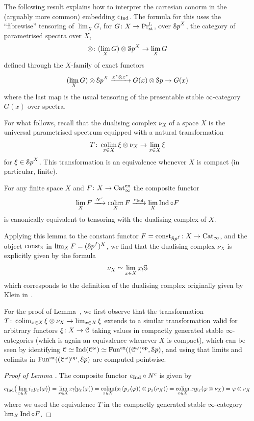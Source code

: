 The following result explains how to interpret the cartesian conorm in the (arguably more common) embedding $e_{\operatorname{Ind}}$. The formula for this uses the ``fibrewise'' tensoring of $\lim_X G$, for $G\colon X\to \mathrm{Pr}^{\mathrm{L}}_{\mathrm{st}}$, over ${\mathcal Sp}^X$, the category of parametrised spectra over $X$, 
\[
\otimes \colon (\lim_X G) \otimes {\mathcal Sp}^X \to \lim_X G
\]
defined through the $X$-family of exact functors
\[
(\lim_X G)\otimes {\mathcal Sp}^X \xrightarrow{x^*\otimes x^*} G(x)\otimes {\mathcal Sp} \to G(x)
\]
where the last map is the usual tensoring of the presentable stable $\infty$-category $G(x)$ over spectra.

For what follows, recall that the dualising complex $\nu_X$ of a space $X$ is the universal parametrised spectrum equipped with a natural transformation 
\[
T\colon \mathop{\mathrm{colim}}_{x\in X} \xi\otimes \nu_X \to \lim_{x\in X} \xi
\]
for $\xi\in {\mathcal Sp}^X$. This transformation is %
an equivalence whenever $X$ is compact (in particular, finite). 

\begin{lemma}
\label{lem:e_Ind_of_cartesian_conorm}%
For any finite space $X$ and $F\colon X\to \mathrm{Cat}_\infty^{\mathrm{ex}}$ the %
composite functor 
\[
\lim_X F \xrightarrow{N^c} \mathop{\mathrm{colim}}_X F \xrightarrow{e_{\operatorname{Ind}}} \lim_X \operatorname{Ind}\circ F
\]
is canonically equivalent to tensoring with the dualising complex of $X$.
\end{lemma}


\begin{remark}
Applying this lemma to the constant functor $F=\mathrm{const}_{{\mathcal Sp}^f}\colon X\to \mathrm{Cat}_\infty$, and the object $\mathrm{const}_{\mathbb{S}}$ in $\lim_X F = ({\mathcal Sp}^f)^X$,  we find that the dualising complex $\nu_X$ is explicitly given by the formula 
\[
\nu_X \simeq \lim_{x\in X} x_! \mathbb{S}
\]
which corresponds to the definition of the dualising complex originally given by Klein in \cite{klein-dualizing}.
\end{remark}

For the proof of Lemma~, we first observe that the transformation $T\colon \mathop{\mathrm{colim}}_{x\in X} \xi\otimes \nu_X \to \lim_{x\in X} \xi
$ %
extends to a similar transformation valid for arbitrary functors $\xi\colon X\to \mathcal C$ taking values in compactly generated stable $\infty$-categories (which is again an equivalence whenever $X$ is compact), which can be seen by identifying $\mathcal C\simeq \operatorname{Ind}(\mathcal C^\omega) \simeq \operatorname{Fun^{ex}}((\mathcal C^\omega)^\mathrm{op}, {\mathcal Sp})$, and using that limits and colimits in $\operatorname{Fun^{ex}}((\mathcal C^\omega)^\mathrm{op}, {\mathcal Sp})$ are computed pointwise.

\begin{proof}[Proof of Lemma ]
The composite functor $e_{\operatorname{Ind}} \circ N^c$ is given by 
\[
e_{\operatorname{Ind}}\big(\lim_{x \in X}i_xp_x(\varphi)\big) = \lim_{x\in X} x_!(p_x(\varphi))= \mathop{\mathrm{colim}}_{x\in X} (x_!(p_x(\varphi)) \otimes p_x(\nu_X)) = \mathop{\mathrm{colim}}_{x\in X} x_! p_x(\varphi\otimes \nu_X) = \varphi\otimes \nu_X
\]
where we used the equivalence $T$ in the compactly generated stable $\infty$-category $\lim_X \operatorname{Ind}\circ F$.
\end{proof}



